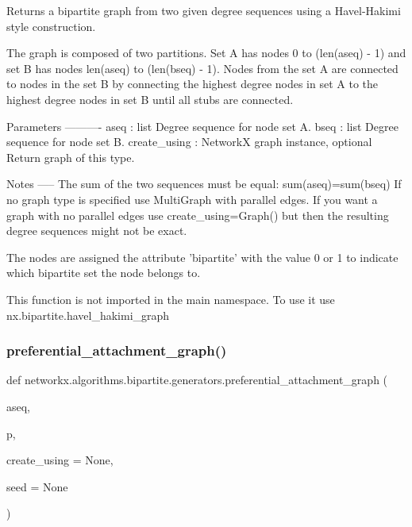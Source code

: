 \begin{DoxyVerb}Returns a bipartite graph from two given degree sequences using a
Havel-Hakimi style construction.

The graph is composed of two partitions. Set A has nodes 0 to
(len(aseq) - 1) and set B has nodes len(aseq) to (len(bseq) - 1).
Nodes from the set A are connected to nodes in the set B by
connecting the highest degree nodes in set A to the highest degree
nodes in set B until all stubs are connected.

Parameters
----------
aseq : list
   Degree sequence for node set A.
bseq : list
   Degree sequence for node set B.
create_using : NetworkX graph instance, optional
   Return graph of this type.

Notes
-----
The sum of the two sequences must be equal: sum(aseq)=sum(bseq)
If no graph type is specified use MultiGraph with parallel edges.
If you want a graph with no parallel edges use create_using=Graph()
but then the resulting degree sequences might not be exact.

The nodes are assigned the attribute 'bipartite' with the value 0 or 1
to indicate which bipartite set the node belongs to.

This function is not imported in the main namespace.
To use it use nx.bipartite.havel_hakimi_graph
\end{DoxyVerb}
 \mbox{\label{namespacenetworkx_1_1algorithms_1_1bipartite_1_1generators_adfb011eefdc46e36698351edf275a380}} 
\subsubsection{\texorpdfstring{preferential\+\_\+attachment\+\_\+graph()}{preferential\_attachment\_graph()}}
{\footnotesize\ttfamily def networkx.\+algorithms.\+bipartite.\+generators.\+preferential\+\_\+attachment\+\_\+graph (\begin{DoxyParamCaption}\item[{}]{aseq,  }\item[{}]{p,  }\item[{}]{create\+\_\+using = {\ttfamily None},  }\item[{}]{seed = {\ttfamily None} }\end{DoxyParamCaption})}

